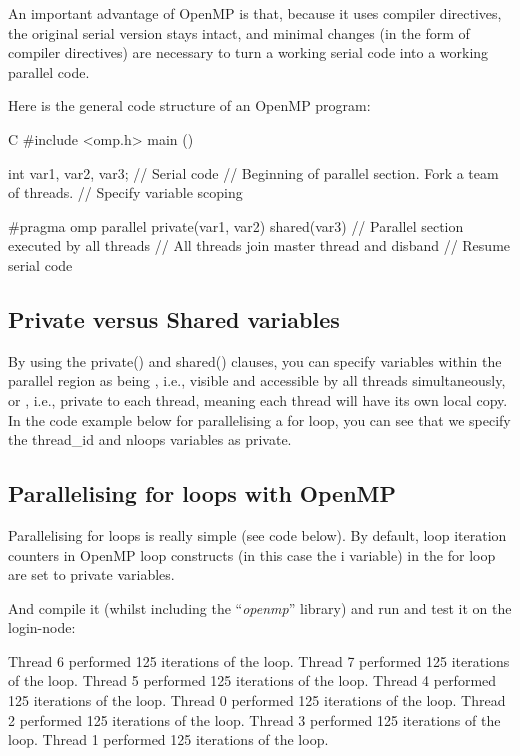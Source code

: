 An important advantage of OpenMP is that, because it uses compiler directives,
the original serial version stays intact, and minimal changes (in the form of
compiler directives) are necessary to turn a working serial code into a working
parallel code.

Here is the general code structure of an OpenMP program:

\begin{code}{C}
#include <omp.h>
main ()  {
int var1, var2, var3;
// Serial code
// Beginning of parallel section. Fork a team of threads.
// Specify variable scoping

#pragma omp parallel private(var1, var2) shared(var3)
  {
  // Parallel section executed by all threads
  // All threads join master thread and disband
  }
// Resume serial code
}
\end{code}

\subsection{Private versus Shared variables}

By using the private() and shared() clauses, you can specify variables within
the parallel region as being , i.e., visible and accessible by
all threads simultaneously, or , i.e., private to each thread,
meaning each thread will have its own local copy. In the code example below for
parallelising a for loop, you can see that we specify the thread\_id and nloops
variables as private.

\subsection{Parallelising for loops with OpenMP}

Parallelising for loops is really simple (see code below). By default, loop
iteration counters in OpenMP loop constructs (in this case the i variable) in
the for loop are set to private variables.


And compile it (whilst including the ``\emph{openmp}'' library) and run and test it on the login-node:

\begin{prompt}
Thread 6 performed 125 iterations of the loop.
Thread 7 performed 125 iterations of the loop.
Thread 5 performed 125 iterations of the loop.
Thread 4 performed 125 iterations of the loop.
Thread 0 performed 125 iterations of the loop.
Thread 2 performed 125 iterations of the loop.
Thread 3 performed 125 iterations of the loop.
Thread 1 performed 125 iterations of the loop.
\end{prompt}

